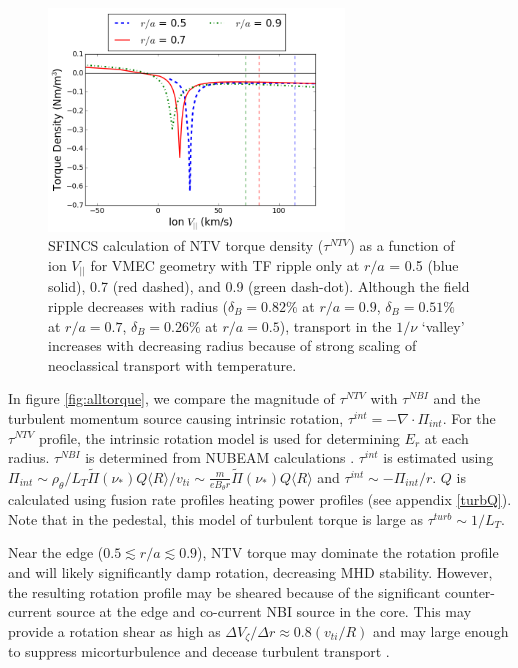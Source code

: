 \documentclass{article}
\numberwithin{figure}{section}
\numberwithin{equation}{section}
\begin{document}
\begin{figure}[h!]
\centering
\includegraphics[width=0.7\textwidth]
{Torque_radiusscaling.png}
\caption{\label{fig:Torque_radiusscaling} SFINCS calculation of NTV torque density ($\tau^{NTV}$) as a function of ion $V_{||}$ for VMEC geometry with TF ripple only at $r/a$ = 0.5 (blue solid), 0.7 (red dashed), and 0.9 (green dash-dot). Although the field ripple decreases with radius ($\delta_B = 0.82\%$ at $r/a = 0.9$, $\delta_B = 0.51\%$ at $r/a = 0.7$, $\delta_B = 0.26\%$ at $r/a = 0.5$), transport in the $1/\nu$ `valley' increases with decreasing radius because of strong scaling of neoclassical transport with temperature. }
\end{figure}

In figure \ref{fig:alltorque}, we compare the magnitude of $\tau^{NTV}$ with $\tau^{NBI}$ and the turbulent momentum source causing intrinsic rotation, $\tau^{int} = -\nabla \cdot \Pi_{int}$. For the $\tau^{NTV}$ profile, the intrinsic rotation model is used for determining $E_r$ at each radius. $\tau^{NBI}$ is determined from NUBEAM calculations \cite{Poli2014}. $\tau^{int}$ is estimated using $\Pi_{int} \sim \rho_{\theta}/L_T \widetilde{\Pi}(\nu_*) Q \langle R \rangle/v_{ti} \sim \frac{m}{eB_{\theta}r} \widetilde{\Pi}(\nu_*) Q \langle R \rangle$ and $\tau^{int} \sim -\Pi_{int}/r$. $Q$ is calculated using fusion rate profiles heating power profiles (see appendix \ref{turbQ}). Note that in the pedestal, this model of turbulent torque is large as $\tau^{turb} \sim 1/L_T$. 

Near the edge ($0.5 \lesssim r/a \lesssim 0.9$), NTV torque may dominate the rotation profile and will likely significantly damp rotation, decreasing MHD stability. However, the resulting rotation profile may be sheared because of the significant counter-current source at the edge and co-current NBI source in the core. This may provide a rotation shear as high as $\Delta V_{\zeta}/ \Delta r \approx 0.8 (v_{ti}/R)$ and may large enough to suppress micorturbulence and decease turbulent transport \cite{Hahm1994}. 
\end{document}

